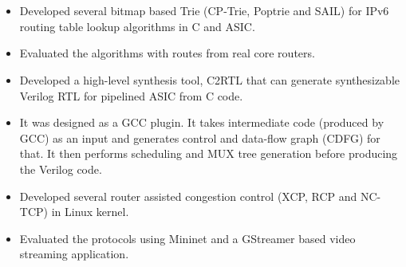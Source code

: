 \documentclass[10pt,a4paper,ragged2e]{altacv}
\begin{document}
\\
\\







\begin{itemize}
	\item Developed several bitmap based Trie (CP-Trie, Poptrie and SAIL) for IPv6 routing table lookup algorithms in C and ASIC. 
	\item Evaluated the algorithms with routes from real core routers.
\end{itemize}
\smallskip
{}
\begin{itemize}
	\item Developed a high-level synthesis tool, C2RTL that can generate synthesizable Verilog RTL for pipelined ASIC from C code.
	\item It was designed as a GCC plugin. It takes intermediate code (produced by GCC) as an input and generates control and data-flow graph (CDFG) for that. It then performs scheduling and MUX tree generation before producing the Verilog code. 
\end{itemize}
\smallskip
{}
\begin{itemize}
	\item Developed several router assisted congestion control (XCP, RCP and NC-TCP)  in Linux kernel.
	\item Evaluated the protocols using Mininet and a GStreamer based video streaming application. 
\end{itemize}
\end{document}
